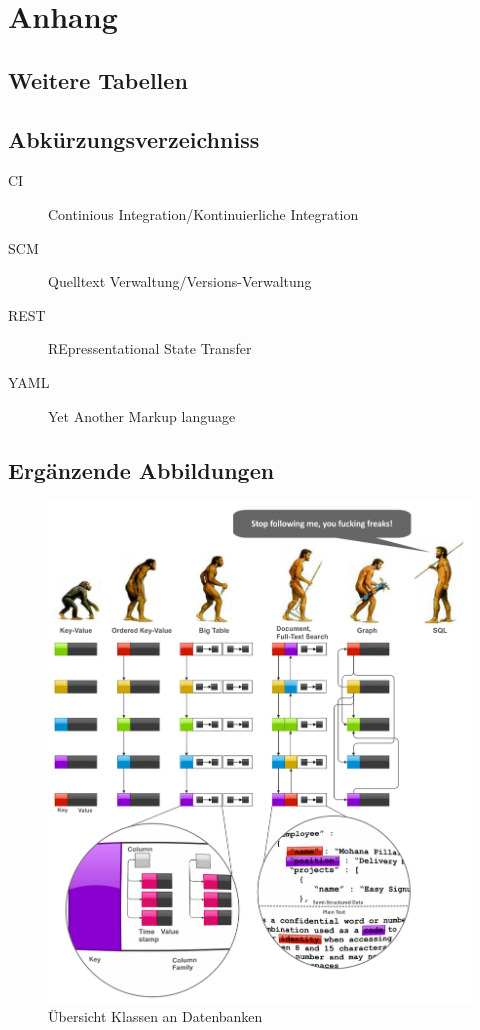 \appendix
\chapter{Anhang}
\section{Weitere Tabellen}
\section{Abkürzungsverzeichniss}
\begin{description}
  \item[CI] Continious Integration/Kontinuierliche Integration
  \item[SCM] Quelltext Verwaltung/Versions-Verwaltung
  \item[REST] REpressentational State Transfer \cite{rest:definition}
  \item[YAML] Yet Another Markup language \cite{yaml:website}
\end{description}


\section{Ergänzende Abbildungen}


\begin{figure}
    \includegraphics[width=\textwidth]{images/databases-overview.png}
    \caption{Übersicht Klassen an Datenbanken}
    \label{fig:klassen-datenbanken}
\end{figure}

